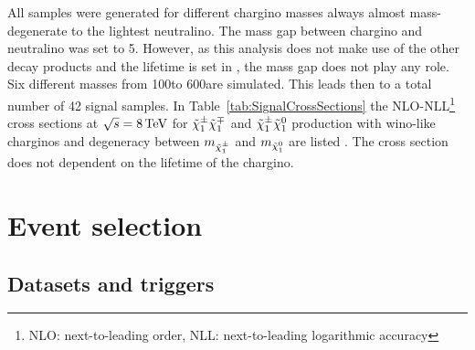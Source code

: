 All samples were generated for different chargino masses always almost mass-degenerate to the lightest neutralino.
The mass gap between chargino and neutralino was set to 5\gev.
However, as this analysis does not make use of the other decay products and the lifetime is set in \geant, the mass gap does not play any role.
Six different masses from 100\gev to 600\gev are simulated.
This leads then to a total number of 42 signal samples.
In Table~\ref{tab:SignalCrossSections} the NLO-NLL\footnote{NLO: next-to-leading order, NLL: next-to-leading logarithmic accuracy} cross sections at $\sqrt{s}=8\,\text{Te}\kern-0.06667em\text{V}$ for $\tilde{\chi}^{\pm}_{1}\tilde{\chi}^{\mp}_{1}$ and $\tilde{\chi}^{\pm}_{1}\tilde{\chi}^{0}_{1}$ production 
with wino-like charginos and degeneracy between $m_{\tilde{\chi}^{\pm}_{1}}$ and $m_{\tilde{\chi}^{0}_{1}}$ are listed \cite{bib:SignalCrossSection_2012,bib:SignalCrossSection_2013}.
The cross section does not dependent on the lifetime of the chargino.
\renewcommand{\arraystretch}{1.5}
\begin{table}[!h]
\centering
\caption{Produced signal simulated samples with corresponding cross sections}
\label{tab:SignalCrossSections}
\end{table}  
\section{Event selection}
\label{sec:EventSelection}
\subsection{Datasets and triggers}

